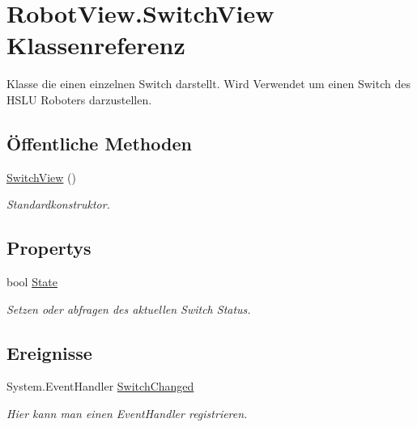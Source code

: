 \hypertarget{class_robot_view_1_1_switch_view}{
\section{RobotView.SwitchView Klassenreferenz}
\label{class_robot_view_1_1_switch_view}
}


Klasse die einen einzelnen Switch darstellt. Wird Verwendet um einen Switch des HSLU Roboters darzustellen.  


\subsection*{Öffentliche Methoden}
\begin{DoxyCompactItemize}
\item 
\hyperlink{class_robot_view_1_1_switch_view_adf984c63fc036efa55ca459e25a5cefd}{SwitchView} ()
\begin{DoxyCompactList}\small\item\em Standardkonstruktor. \item\end{DoxyCompactList}\end{DoxyCompactItemize}
\subsection*{Propertys}
\begin{DoxyCompactItemize}
\item 
bool \hyperlink{class_robot_view_1_1_switch_view_a78d6236230e163636d827c42cccdfbd9}{State}
\begin{DoxyCompactList}\small\item\em Setzen oder abfragen des aktuellen Switch Status. \item\end{DoxyCompactList}\end{DoxyCompactItemize}
\subsection*{Ereignisse}
\begin{DoxyCompactItemize}
\item 
System.EventHandler \hyperlink{class_robot_view_1_1_switch_view_a2254d22e9d9d1fd1fae8208f52d689d0}{SwitchChanged}
\begin{DoxyCompactList}\small\item\em Hier kann man einen EventHandler registrieren. \item\end{DoxyCompactList}\end{DoxyCompactItemize}


